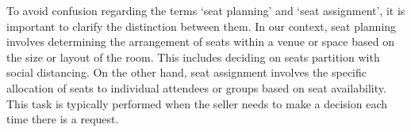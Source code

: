 
To avoid confusion regarding the terms `seat planning' and `seat assignment', it is important to clarify the distinction between them. In our context, seat planning involves determining the arrangement of seats within a venue or space based on the size or layout of the room. This includes deciding on seats partition with social distancing. On the other hand, seat assignment involves the specific allocation of seats to individual attendees or groups based on seat availability. This task is typically performed when the seller needs to make a decision each time there is a request.








